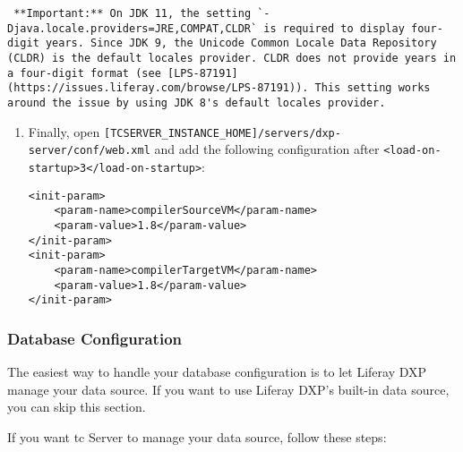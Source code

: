 \begin{verbatim}
 **Important:** On JDK 11, the setting `-Djava.locale.providers=JRE,COMPAT,CLDR` is required to display four-digit years. Since JDK 9, the Unicode Common Locale Data Repository (CLDR) is the default locales provider. CLDR does not provide years in a four-digit format (see [LPS-87191](https://issues.liferay.com/browse/LPS-87191)). This setting works around the issue by using JDK 8's default locales provider.
\end{verbatim}

\noindent\hrulefill

\begin{enumerate}
\def\labelenumi{\arabic{enumi}.}
\setcounter{enumi}{3}
\item
  Finally, open
  \texttt{{[}TCSERVER\_INSTANCE\_HOME{]}/servers/dxp-server/conf/web.xml}
  and add the following configuration after
  \texttt{\textless{}load-on-startup\textgreater{}3\textless{}/load-on-startup\textgreater{}}:

\begin{verbatim}
<init-param>
    <param-name>compilerSourceVM</param-name>
    <param-value>1.8</param-value>
</init-param>
<init-param>
    <param-name>compilerTargetVM</param-name>
    <param-value>1.8</param-value>
</init-param> 
\end{verbatim}
\end{enumerate}

\subsubsection{Database Configuration}\label{database-configuration-3}

The easiest way to handle your database configuration is to let Liferay
DXP manage your data source. If you want to use Liferay DXP's built-in
data source, you can skip this section.

If you want tc Server to manage your data source, follow these steps:


